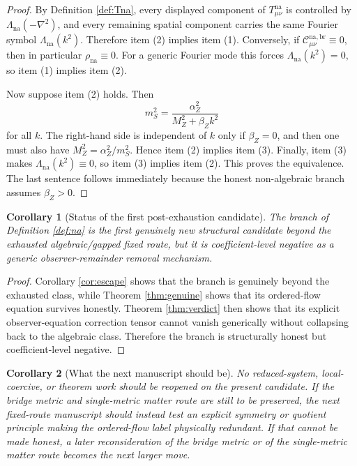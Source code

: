 \documentclass[11pt]{article}
\newtheorem{corollary}{Corollary}
\begin{document}
\begin{proof}
By Definition \ref{def:Tna}, every displayed component of \(T_{\mu\nu}^{\mathrm{na}}\) is controlled by \(\Lambda_{\mathrm{na}}(-\nabla^2)\), and every remaining spatial component carries the same Fourier symbol \(\Lambda_{\mathrm{na}}(k^2)\). Therefore item (2) implies item (1). Conversely, if \(\mathcal C_{\mu\nu}^{\mathrm{na,br}}\equiv0\), then in particular \(\rho_{\mathrm{na}}\equiv0\). For a generic Fourier mode this forces \(\Lambda_{\mathrm{na}}(k^2)=0\), so item (1) implies item (2).

Now suppose item (2) holds. Then
\[
m_S^2=\frac{\alpha_Z^2}{M_Z^2+\beta_Zk^2}
\]
for all \(k\). The right-hand side is independent of \(k\) only if \(\beta_Z=0\), and then one must also have \(M_Z^2=\alpha_Z^2/m_S^2\). Hence item (2) implies item (3). Finally, item (3) makes \(\Lambda_{\mathrm{na}}(k^2)\equiv0\), so item (3) implies item (2). This proves the equivalence. The last sentence follows immediately because the honest non-algebraic branch assumes \(\beta_Z>0\).
\end{proof}

\begin{corollary}[Status of the first post-exhaustion candidate]
\label{cor:status}
The branch of Definition \ref{def:na} is the first genuinely new structural candidate beyond the exhausted algebraic/gapped fixed route, but it is coefficient-level negative as a generic observer-remainder removal mechanism.
\end{corollary}

\begin{proof}
Corollary \ref{cor:escape} shows that the branch is genuinely beyond the exhausted class, while Theorem \ref{thm:genuine} shows that its ordered-flow equation survives honestly. Theorem \ref{thm:verdict} then shows that its explicit observer-equation correction tensor cannot vanish generically without collapsing back to the algebraic class. Therefore the branch is structurally honest but coefficient-level negative.
\end{proof}

\begin{corollary}[What the next manuscript should be]
\label{cor:next}
No reduced-system, local-coercive, or theorem work should be reopened on the present candidate. If the bridge metric and single-metric matter route are still to be preserved, the next fixed-route manuscript should instead test an explicit symmetry or quotient principle making the ordered-flow label physically redundant. If that cannot be made honest, a later reconsideration of the bridge metric or of the single-metric matter route becomes the next larger move.
\end{corollary}
\end{document}
